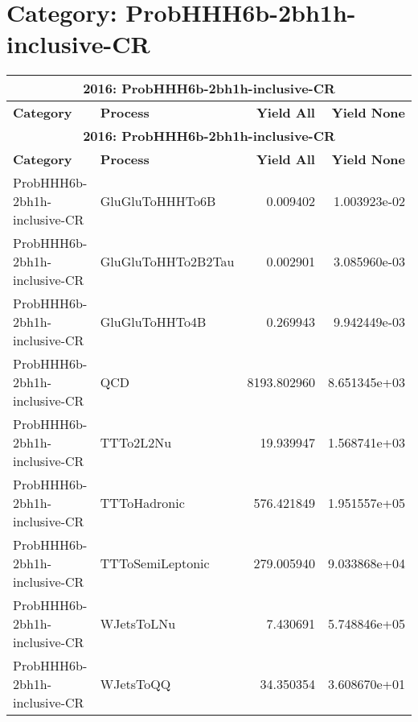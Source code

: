 \documentclass{article}
\begin{document}
\section*{Category: ProbHHH6b-2bh1h-inclusive-CR}
\begin{longtable}[c]{|l|l|r|r|}
\hline
\multicolumn{4}{|c|}{\textbf{2016: ProbHHH6b-2bh1h-inclusive-CR}} \\
\hline
\textbf{Category} & \textbf{Process} & \textbf{Yield All} & \textbf{Yield None} \\
\hline
\endfirsthead
\hline
\multicolumn{4}{|c|}{\textbf{2016: ProbHHH6b-2bh1h-inclusive-CR}} \\
\hline
\textbf{Category} & \textbf{Process} & \textbf{Yield All} & \textbf{Yield None} \\
\hline
\endhead
ProbHHH6b-2bh1h-inclusive-CR & GluGluToHHHTo6B & 0.009402 & 1.003923e-02 \\
\hline
ProbHHH6b-2bh1h-inclusive-CR & GluGluToHHTo2B2Tau & 0.002901 & 3.085960e-03 \\
\hline
ProbHHH6b-2bh1h-inclusive-CR & GluGluToHHTo4B & 0.269943 & 9.942449e-03 \\
\hline
ProbHHH6b-2bh1h-inclusive-CR & QCD & 8193.802960 & 8.651345e+03 \\
\hline
ProbHHH6b-2bh1h-inclusive-CR & TTTo2L2Nu & 19.939947 & 1.568741e+03 \\
\hline
ProbHHH6b-2bh1h-inclusive-CR & TTToHadronic & 576.421849 & 1.951557e+05 \\
\hline
ProbHHH6b-2bh1h-inclusive-CR & TTToSemiLeptonic & 279.005940 & 9.033868e+04 \\
\hline
ProbHHH6b-2bh1h-inclusive-CR & WJetsToLNu & 7.430691 & 5.748846e+05 \\
\hline
ProbHHH6b-2bh1h-inclusive-CR & WJetsToQQ & 34.350354 & 3.608670e+01 \\
\hline
\end{longtable}
\end{document}

